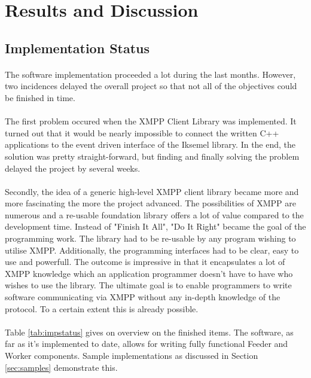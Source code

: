\section{Results and Discussion}
\label{sec:discussion}

\subsection{Implementation Status}
\paragraph{}
The software implementation proceeded a lot during the last months. However, two incidences delayed the overall project so that not all of the objectives could be finished in time.

\paragraph{}
The first problem occured when the XMPP Client Library was implemented. It turned out that it would be nearly impossible to connect the written C++ applications to the event driven interface of the Iksemel library. In the end, the solution was pretty straight-forward, but finding and finally solving the problem delayed the project by several weeks.

\paragraph{}
Secondly, the idea of a generic high-level XMPP client library became more and more fascinating the more the project advanced. The possibilities of XMPP are numerous and a re-usable foundation library offers a lot of value compared to the development time. Instead of "Finish It All", "Do It Right" became the goal of the programming work. The library had to be re-usable by any program wishing to utilise XMPP. Additionally, the programming interfaces had to be clear, easy to use and powerfull. The outcome is impressive in that it encapsulates a lot of XMPP knowledge which an application programmer doesn't have to have who wishes to use the library. The ultimate goal is to enable programmers to write software communicating via XMPP without any in-depth knowledge of the protocol. To a certain extent this is already possible.

\paragraph{}
Table \ref{tab:impstatus} gives on overview on the finished items. The software, as far as it's implemented to date, allows for writing fully functional Feeder and Worker components. Sample implementations as discussed in Section \ref{sec:samples} demonstrate this.

